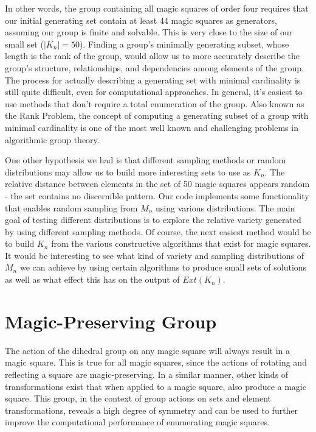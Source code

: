 \documentclass[12pt]{report}
\begin{document}
\par In other words, the group containing all magic squares of order four requires that our initial
generating set contain at least 44 magic squares as generators, assuming our group is finite and
solvable. This is very close to the size of our small set ($\left|K_n\right|=50$). Finding a
group's minimally generating subset, whose length is the rank of the group, would allow us to more
accurately describe the group's structure, relationships, and dependencies among elements of the
group. The process for actually describing a generating set with minimal cardinality is still quite
difficult, even for computational approaches. In general, it's easiest to use methods that don't
require a total enumeration of the group. Also known as the Rank Problem, the concept of computing
a generating subset of a group with minimal cardinality is one of the most well known and
challenging problems in algorithmic group theory.

\par One other hypothesis we had is that different sampling methods or random distributions may
allow us to build more interesting sets to use as $K_n$. The relative distance between elements in
the
set of 50 magic squares appears random \hyphen{} the set contains no discernible pattern. Our code
implements some functionality that enables random sampling from $M_n$ using various distributions.
The
main goal of testing different distributions is to explore the relative variety generated by using
different sampling methods. Of course, the next easiest method would be to build $K_n$ from the
various constructive algorithms that exist for magic squares. It would be interesting to see what
kind of variety and sampling distributions of $M_n$ we can achieve by using certain algorithms to
produce small sets of solutions as well as what effect this has on the output of
$Ext\left(K_n\right)$.

\section{Magic-Preserving Group}

\par The action of the dihedral group on any magic square will always result in a magic square.
This is true for all magic squares, since the actions of rotating and reflecting a square are
magic-preserving. In a similar manner, other kinds of transformations exist that when applied to a
magic square, also produce a magic square. This group, in the context of group actions on sets and
element transformations, reveals a high degree of symmetry and can be used to further improve the
computational performance of enumerating magic squares.
\end{document}
